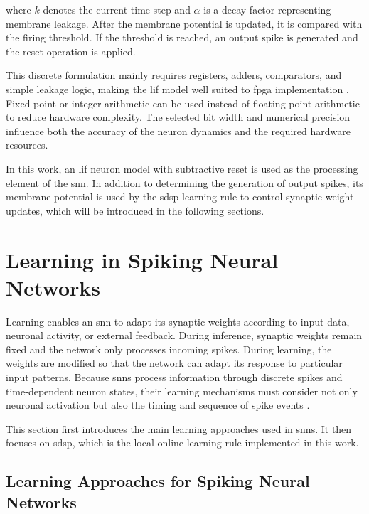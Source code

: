 where \(k\) denotes the current time step and \(\alpha\) is a decay factor representing membrane leakage. After the membrane potential is updated, it is compared with the firing threshold. If the threshold is reached, an output spike is generated and the reset operation is applied.

This discrete formulation mainly requires registers, adders, comparators, and simple leakage logic, making the \gls{lif} model well suited to \gls{fpga} implementation \cite{Carpegna2025}. Fixed-point or integer arithmetic can be used instead of floating-point arithmetic to reduce hardware complexity. The selected bit width and numerical precision influence both the accuracy of the neuron dynamics and the required hardware resources.

In this work, an \gls{lif} neuron model with subtractive reset is used as the processing element of the \gls{snn}. In addition to determining the generation of output spikes, its membrane potential is used by the \gls{sdsp} learning rule to control synaptic weight updates, which will be introduced in the following sections.

\section{Learning in Spiking Neural Networks}
\label{subsec: learning in spiking neural networks}

Learning enables an \gls{snn} to adapt its synaptic weights according to input data, neuronal activity, or external feedback. During inference, synaptic weights remain fixed and the network only processes incoming spikes. During learning, the weights are modified so that the network can adapt its response to particular input patterns. Because \gls{snn}s process information through discrete spikes and time-dependent neuron states, their learning mechanisms must consider not only neuronal activation but also the timing and sequence of spike events \cite{Gerstner2014,Neftci2019}.

This section first introduces the main learning approaches used in \gls{snn}s. It then focuses on \gls{sdsp}, which is the local online learning rule implemented in this work.

\subsection{Learning Approaches for Spiking Neural Networks}
\label{subsec: learning approaches for snns}

